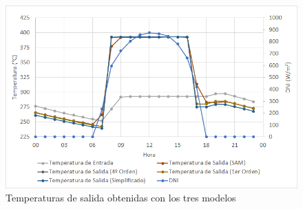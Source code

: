 \begin{figure}[!h]
\includegraphics[width=0.9\linewidth]{images/temperaturas_modelos.png}
\caption{Temperaturas de salida obtenidas con los tres modelos} 
\label{fig:temperturas_modelos}
\end{figure}



